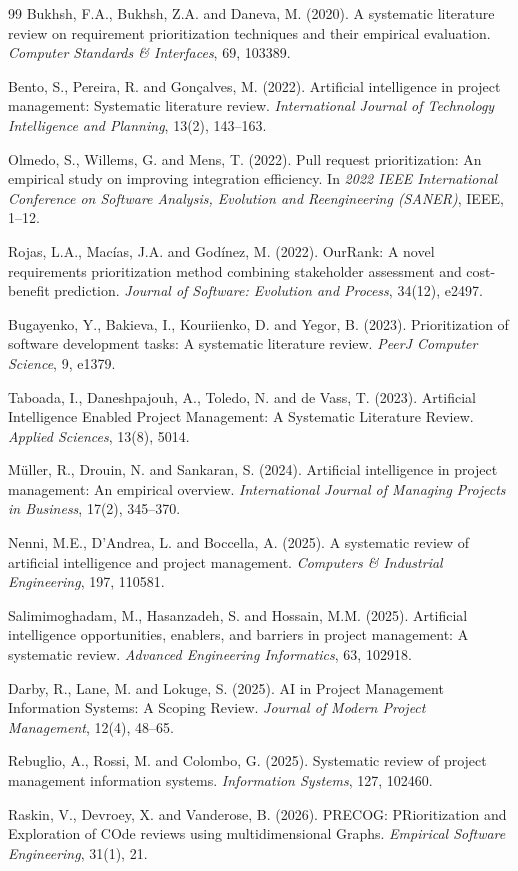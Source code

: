 \documentclass[12pt,a4paper,oneside]{report}
\begin{document}
\begin{thebibliography}{99}
Bukhsh, F.A., Bukhsh, Z.A. and Daneva, M. (2020). A systematic literature review on requirement prioritization techniques and their empirical evaluation. \textit{Computer Standards \& Interfaces}, 69, 103389.

Bento, S., Pereira, R. and Gon\c{c}alves, M. (2022). Artificial intelligence in project management: Systematic literature review. \textit{International Journal of Technology Intelligence and Planning}, 13(2), 143--163.

Olmedo, S., Willems, G. and Mens, T. (2022). Pull request prioritization: An empirical study on improving integration efficiency. In \textit{2022 IEEE International Conference on Software Analysis, Evolution and Reengineering (SANER)}, IEEE, 1--12.

Rojas, L.A., Mac\'ias, J.A. and God\'inez, M. (2022). OurRank: A novel requirements prioritization method combining stakeholder assessment and cost-benefit prediction. \textit{Journal of Software: Evolution and Process}, 34(12), e2497.

Bugayenko, Y., Bakieva, I., Kouriienko, D. and Yegor, B. (2023). Prioritization of software development tasks: A systematic literature review. \textit{PeerJ Computer Science}, 9, e1379.

Taboada, I., Daneshpajouh, A., Toledo, N. and de Vass, T. (2023). Artificial Intelligence Enabled Project Management: A Systematic Literature Review. \textit{Applied Sciences}, 13(8), 5014.

M\"uller, R., Drouin, N. and Sankaran, S. (2024). Artificial intelligence in project management: An empirical overview. \textit{International Journal of Managing Projects in Business}, 17(2), 345--370.

Nenni, M.E., D'Andrea, L. and Boccella, A. (2025). A systematic review of artificial intelligence and project management. \textit{Computers \& Industrial Engineering}, 197, 110581.

Salimimoghadam, M., Hasanzadeh, S. and Hossain, M.M. (2025). Artificial intelligence opportunities, enablers, and barriers in project management: A systematic review. \textit{Advanced Engineering Informatics}, 63, 102918.

Darby, R., Lane, M. and Lokuge, S. (2025). AI in Project Management Information Systems: A Scoping Review. \textit{Journal of Modern Project Management}, 12(4), 48--65.

Rebuglio, A., Rossi, M. and Colombo, G. (2025). Systematic review of project management information systems. \textit{Information Systems}, 127, 102460.

Raskin, V., Devroey, X. and Vanderose, B. (2026). PRECOG: PRioritization and Exploration of COde reviews using multidimensional Graphs. \textit{Empirical Software Engineering}, 31(1), 21.

\end{thebibliography}
\end{document}
